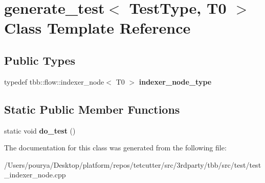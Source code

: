 \hypertarget{classgenerate__test_3_01TestType_00_01T0_01_4}{}\section{generate\+\_\+test$<$ Test\+Type, T0 $>$ Class Template Reference}
\label{classgenerate__test_3_01TestType_00_01T0_01_4}
\subsection*{Public Types}
\begin{DoxyCompactItemize}
\item 
\hypertarget{classgenerate__test_3_01TestType_00_01T0_01_4_ac5fe9f68f909cca2e191bbd9d835d16f}{}typedef tbb\+::flow\+::indexer\+\_\+node$<$ T0 $>$ {\bfseries indexer\+\_\+node\+\_\+type}\label{classgenerate__test_3_01TestType_00_01T0_01_4_ac5fe9f68f909cca2e191bbd9d835d16f}

\end{DoxyCompactItemize}
\subsection*{Static Public Member Functions}
\begin{DoxyCompactItemize}
\item 
\hypertarget{classgenerate__test_3_01TestType_00_01T0_01_4_afcdeb4fb56c001853c104aa11d617cf5}{}static void {\bfseries do\+\_\+test} ()\label{classgenerate__test_3_01TestType_00_01T0_01_4_afcdeb4fb56c001853c104aa11d617cf5}

\end{DoxyCompactItemize}


The documentation for this class was generated from the following file\+:\begin{DoxyCompactItemize}
\item 
/\+Users/pourya/\+Desktop/platform/repos/tetcutter/src/3rdparty/tbb/src/test/test\+\_\+indexer\+\_\+node.\+cpp\end{DoxyCompactItemize}
